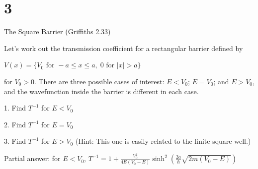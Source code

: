 \documentclass{article}
\begin{document}
\section*{3}
\begin{ques}
The Square Barrier (Griffiths 2.33)

Let’s work out the transmission coefficient for a rectangular barrier defined by

$V(x) = \{ V_0 \text{ for } -a \le x \le a,\; 0 \text{ for } |x| > a \}$

for $V_0 > 0$. There are three possible cases of interest: $E < V_0$; $E = V_0$; and $E > V_0$, and the wavefunction inside the barrier is different in each case.

1. Find $T^{-1}$ for $E < V_0$

2. Find $T^{-1}$ for $E = V_0$

3. Find $T^{-1}$ for $E > V_0$ (Hint: This one is easily related to the finite square well.)

Partial answer: for $E < V_0$,  
$T^{-1} = 1 + \frac{V_0^2}{4E(V_0 - E)} \sinh^2\left( \frac{2a}{\hbar} \sqrt{2m(V_0 - E)} \right)$
\end{ques}
\end{document}
